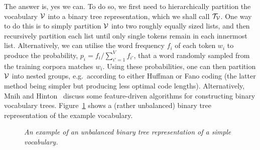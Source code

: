 \documentclass[a4paper]{article}
\begin{document}
The answer is, yes we can. To do so, we first need to hierarchically partition the vocabulary ${\cal V}$ into 
a binary tree representation, which we shall call ${\cal T}_{\cal V}$. 
One way to do this is to simply partition ${\cal V}$ into two roughly equally sized lists, and then
recursively partition each list until only single tokens remain in each innermost list.
Alternatively, we can utilise the word frequency $f_i$ of each token $w_i$ to produce the probability,
$p_i=f_i/\sum_{i'=1}^V f_{i'}$, that a word randomly sampled from the training corpora matches $w_i$.
Using these probabilities, one can then partition ${\cal V}$ into nested groups, e.g.\ according to
either Huffman or Fano coding (the latter method being simpler but producing less optimal code lengths).
Alternatively, Mnih and Hinton~\cite{NIPS2008_3583} discuss some feature-driven algorithms for constructing
binary vocabulary trees.
Figure~\ref{fig:catdog} shows a (rather unbalanced) binary tree representation of the example vocabulary. 
\begin{figure}[hbt]
\centering
{}
\caption{\em An example of an unbalanced binary tree representation of a simple vocabulary.}
\label{fig:catdog}
\end{figure}
\end{document}
